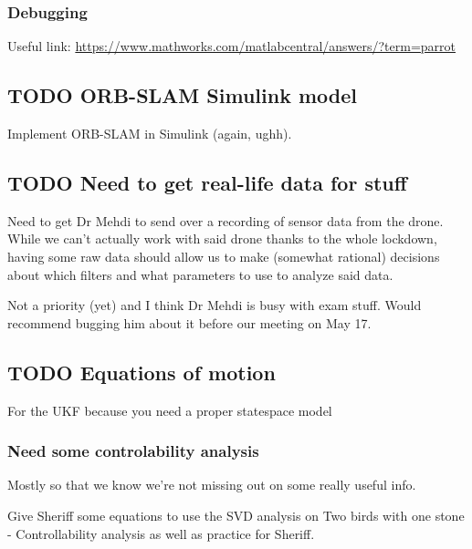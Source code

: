 \documentclass[unrestricted]{meetingnotesminutes}
\begin{document}
\subsubsection{Debugging}
\label{sec:org1bddf7b}

Useful link: \url{https://www.mathworks.com/matlabcentral/answers/?term=parrot}


\subsection{{\bfseries\sffamily TODO} ORB-SLAM Simulink model}
\label{sec:org1afff8e}
Implement ORB-SLAM in Simulink (again, ughh).

\subsection{{\bfseries\sffamily TODO} Need to get real-life data for stuff}
\label{sec:orgaa1723f}
Need to get Dr Mehdi to send over a recording of sensor data from the drone. While we can't actually work with said drone thanks to the whole lockdown, having some raw data should allow us to make (somewhat rational) decisions about which filters and what parameters to use to analyze said data.

Not a priority (yet) and I think Dr Mehdi is busy with exam stuff. Would recommend bugging him about it before our meeting on May 17.

\subsection{{\bfseries\sffamily TODO} Equations of motion}
\label{sec:orga13cdb2}
For the UKF because you need a proper statespace model

\subsubsection{Need some controlability analysis}
\label{sec:org1fa39f7}
Mostly so that we know we're not missing out on some really useful info.

Give Sheriff some equations to use the SVD analysis on
Two birds with one stone - Controllability analysis as well as practice for Sheriff.
\end{document}
